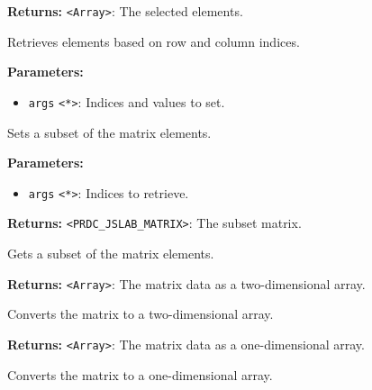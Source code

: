 \documentclass[12pt,a4paper]{article}
\begin{document}
\noindent \textbf{Returns:} \texttt{<Array>}: The selected elements.

\noindent Retrieves elements based on row and column indices.

\vspace{5mm}
\noindent {}


\noindent \textbf{Parameters:}
\begin{itemize}
  \item \texttt{args} \texttt{<*>}: Indices and values to set.
\end{itemize}

\noindent Sets a subset of the matrix elements.

\vspace{5mm}
\noindent {}


\noindent \textbf{Parameters:}
\begin{itemize}
  \item \texttt{args} \texttt{<*>}: Indices to retrieve.
\end{itemize}

\noindent \textbf{Returns:} \texttt{<PRDC\_JSLAB\_MATRIX>}: The subset matrix.

\noindent Gets a subset of the matrix elements.

\vspace{5mm}
\noindent {}


\noindent \textbf{Returns:} \texttt{<Array>}: The matrix data as a two-dimensional array.

\noindent Converts the matrix to a two-dimensional array.

\vspace{5mm}
\noindent {}


\noindent \textbf{Returns:} \texttt{<Array>}: The matrix data as a one-dimensional array.

\noindent Converts the matrix to a one-dimensional array.
\end{document}
